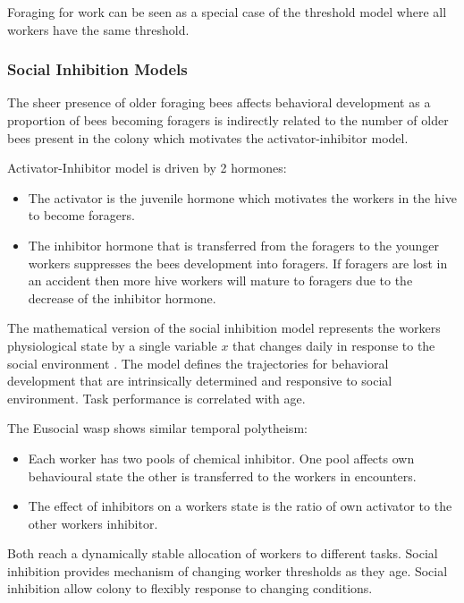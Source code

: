 Foraging for work can be seen as a special case of the threshold model where all workers have the same threshold. %

\subsubsection{Social Inhibition Models}

The sheer presence of older foraging bees affects behavioral development as a proportion of bees becoming foragers is indirectly related to the number of older bees present in the colony  which motivates the activator-inhibitor model.

Activator-Inhibitor model is driven by 2 hormones:
\begin{itemize}
	\item The activator is the juvenile hormone which motivates the workers in the hive to become foragers.
	\item The inhibitor hormone that is transferred from the foragers to the younger workers suppresses the bees development into foragers. If foragers are lost in an accident then more hive workers will mature to foragers due to the decrease of the inhibitor hormone.
\end{itemize}

The mathematical version of the social inhibition model represents the workers physiological state by a single variable $x$ that changes daily in response to the social environment \cite{beshers2001social}. The model defines the trajectories for behavioral development that are intrinsically determined and responsive to social environment. Task performance is correlated with age. 

The Eusocial wasp shows similar temporal polytheism:
\begin{itemize}
	\item Each worker has two pools of chemical inhibitor. One pool affects own behavioural state the other is transferred to the workers in encounters. 
	\item The effect of inhibitors on a workers state is the ratio of own activator to the other workers inhibitor.
\end{itemize}

Both reach a dynamically stable allocation of workers to different tasks. Social inhibition provides mechanism of changing worker thresholds as they age. Social inhibition allow colony to flexibly response to changing conditions.

